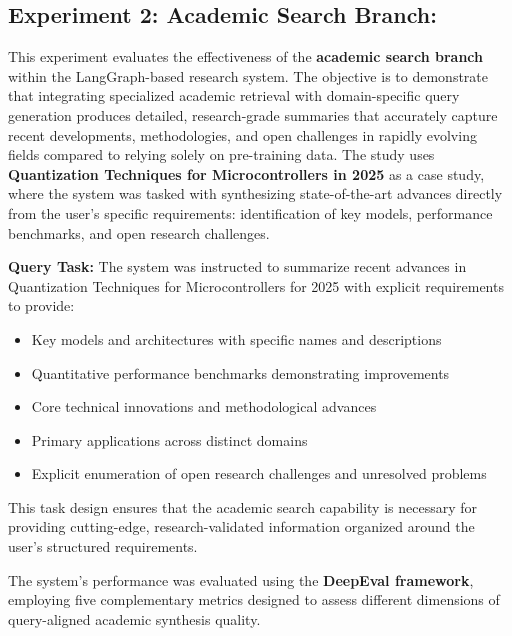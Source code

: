 \subsection{Experiment 2: Academic Search Branch: }

This experiment evaluates the effectiveness of the \textbf{academic search branch} within the LangGraph-based research system. The objective is to demonstrate that integrating specialized academic retrieval with domain-specific query generation produces detailed, research-grade summaries that accurately capture recent developments, methodologies, and open challenges in rapidly evolving fields compared to relying solely on pre-training data. The study uses \textbf{Quantization Techniques for Microcontrollers in 2025} as a case study, where the system was tasked with synthesizing state-of-the-art advances directly from the user's specific requirements: identification of key models, performance benchmarks, and open research challenges.

\textbf{Query Task:} The system was instructed to summarize recent advances in Quantization Techniques for Microcontrollers for 2025 with explicit requirements to provide:
\begin{itemize}
  \item Key models and architectures with specific names and descriptions
  \item Quantitative performance benchmarks demonstrating improvements
  \item Core technical innovations and methodological advances
  \item Primary applications across distinct domains
  \item Explicit enumeration of open research challenges and unresolved problems
\end{itemize}

This task design ensures that the academic search capability is necessary for providing cutting-edge, research-validated information organized around the user's structured requirements.

The system's performance was evaluated using the \textbf{DeepEval framework}, employing five complementary metrics designed to assess different dimensions of query-aligned academic synthesis quality.

